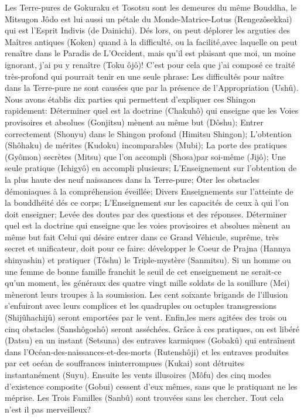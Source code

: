 Les Terre-pures de Gokuraku et Tosotsu sont les demeures du même Bouddha, le Mitsugon Jôdo est lui aussi un pétale du Monde-Matrice-Lotus (Rengezôsekkai) qui est  l'Esprit Indivis (de Dainichi).
Dés lors, on peut déplorer les arguties des Maîtres antiques (Koken) quand à la difficulté, ou la facilité,avec laquelle on peut renaître dans le Paradis de L'Occident, mais qu'il est plaisant que moi, un moine ignorant, j'ai pu y renaître (Toku ôjô)! 
C’est pour cela que j'ai composé ce traité très-profond qui pourrait tenir en une seule phrase: Les difficultés pour naître dans la Terre-pure ne sont causées que par la présence de l’Appropriation (Ushû).
Nous avons établis dix parties qui permettent d’expliquer ces Shingon rapidement:
Déterminer quel est la doctrine (Chakuhô)  qui enseigne que les Voies provisoires et absolues (Gonjitsu) mènent au même but (Dôshu);
 Entrer correctement (Shonyu) dans le Shingon profond (Himitsu Shingon);
 L'obtention (Shôhaku) de mérites (Kudoku) incomparables (Mubi);
 La porte des pratiques (Gyômon)  secrètes (Mitsu) que l'on accompli (Shosa)par soi-même (Jijô);
 Une seule pratique (Ichigyô) en accompli plusieurs;
L'Enseignement sur l'obtention de la plus haute des neuf naissances dans la Terre-pure;
Ôter les obstacles démoniaques à la compréhension éveillée;
Divers Enseignements sur l'atteinte de la bouddhéité dés ce corps;
L'Enseignement sur les capacités de ceux à qui l'on doit enseigner;
Levée des doutes par des questions et des réponses.
Déterminer quel est la doctrine qui enseigne que les voies provisoires et absolues mènent au même but fait
Celui qui désire entrer dans ce Grand Véhicule, suprême, très secret et unificateur, doit pour ce faire: développer le Coeur de Prajna (Hannya shinyashin) et pratiquer (Tôshu) le Triple-mystère (Sanmitsu).
Si un homme ou une femme de bonne famille franchit le seuil de cet enseignement ne serait-ce qu'un moment, les généraux des quatre vingt mille soldats de la souillure (Mei)  mèneront leurs troupes à la soumission. Les cent soixante brigands de l'illusion s'enfuiront avec leurs complices et les quadruples ou octuples transgressions (Shijûhachijû)  seront emportées par le vent. Enfin,les mers agitées des trois ou cinq obstacles (Sanshôgoshô) seront asséchées.
Grâce à ces pratiques, on est libéré (Datsu) en un instant (Setsuna) des entraves karmiques (Gobakû)  qui entraînent dans l'Océan-des-naissances-et-des-morts (Rutenshôji) et les entraves produites par cet océan de souffrances ininterrompues (Kukai) sont détruites instantanément (Suyu). Ensuite les vents illusoires (Môfu) des cinq modes d'existence composite (Gobui) cessent d'eux mêmes, sans que le pratiquant ne les méprise. Les Trois Familles (Sanbû) sont trouvées sans les chercher. Tout cela n'est il pas merveilleux?
